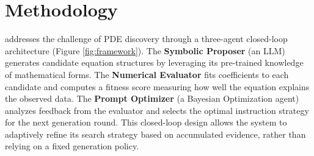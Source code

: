 \section{Methodology}
\label{sec:method}

\ours addresses the challenge of PDE discovery through a three-agent closed-loop architecture (Figure \ref{fig:framework}). The \textbf{Symbolic Proposer} (an LLM) generates candidate equation structures by leveraging its pre-trained knowledge of mathematical forms. The \textbf{Numerical Evaluator} fits coefficients to each candidate and computes a fitness score measuring how well the equation explains the observed data. The \textbf{Prompt Optimizer} (a Bayesian Optimization agent) analyzes feedback from the evaluator and selects the optimal instruction strategy for the next generation round. This closed-loop design allows the system to adaptively refine its search strategy based on accumulated evidence, rather than relying on a fixed generation policy.

